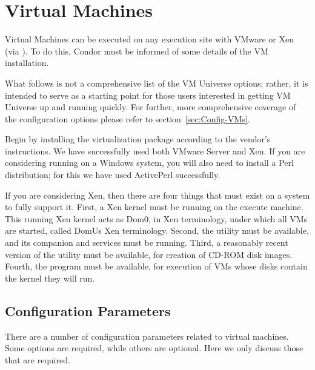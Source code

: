 \section{\label{sec:vm-install}Virtual Machines}


Virtual Machines can be executed on any execution site with VMware or Xen
(via ).  To do this, Condor must be informed of some details 
of the VM installation.

What follows is not a comprehensive list of the VM Universe options; rather,
it is intended to serve as a starting point for those users interested in
getting VM Universe up and running quickly.  For further, more comprehensive 
coverage of the configuration options please refer to 
section~\ref{sec:Config-VMs}.

Begin by installing the virtualization package according to the vendor's
instructions.  We have successfully used both VMware Server and Xen. If you
are considering running on a Windows system, you will also need to install
a Perl distribution; for this we have used ActivePerl successfully. 

If you are considering Xen, then there are four things that must exist on 
a system to fully support it. First, a Xen kernel must be running on the 
execute machine. This running Xen kernel acts as Dom0, in Xen terminology, 
under which all VMs are started, called DomUs Xen terminology. Second, 
the  utility must be available, and its
companion  and  services must be running. Third, a 
reasonably recent version of the  utility must be available, 
for creation of CD-ROM disk images. Fourth, the  program must be 
available, for execution of VMs whose disks contain the kernel they will run.

\subsection{Configuration Parameters}

There are a number of configuration parameters related to virtual
machines. Some options are required, while others are 
optional.  Here we only discuss those that are required.

